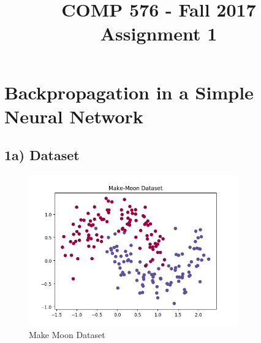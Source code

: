 \documentclass{article}
\title{COMP 576 - Fall 2017\\ Assignment 1}
\begin{document}
\maketitle
{}

\section*{Backpropagation in a Simple Neural Network}

\subsection*{1a) Dataset}

	\begin{figure}[!ht]
		\centering
		\includegraphics[width=90mm]{figures/makemoondata.png}
		\caption{Make Moon Dataset}
	\end{figure}
\end{document}
